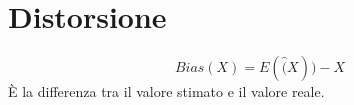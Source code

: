 \section{Distorsione}
\[ Bias(X) = E(\hat(X)) - X \]
\`E la differenza tra il valore stimato e il valore reale.